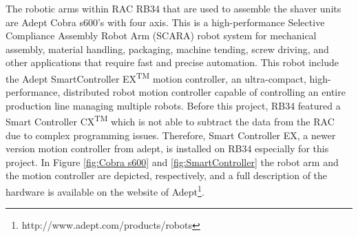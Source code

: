The robotic arms within RAC RB34 that are used to assemble the shaver units are Adept Cobra s600's with four axis. This is a high-performance Selective Compliance Assembly Robot Arm (SCARA) robot system for mechanical assembly, material handling, packaging, machine tending, screw driving, and other applications that require fast and precise automation. This robot include the Adept SmartController EX\textsuperscript{\tiny{TM}} motion controller, an ultra-compact, high-performance, distributed robot motion controller capable of controlling an entire production line managing multiple robots. Before this project, RB34 featured a Smart Controller CX\textsuperscript{\tiny{TM}} which is not able to subtract the data from the RAC due to complex programming issues. Therefore, Smart Controller EX, a newer version motion controller from adept, is installed on RB34 especially for this project. In Figure \ref{fig:Cobra s600} and \ref{fig:SmartController} the robot arm and the motion controller are depicted, respectively, and a full description of the hardware is available on the website of Adept\footnote{http://www.adept.com/products/robots}.
